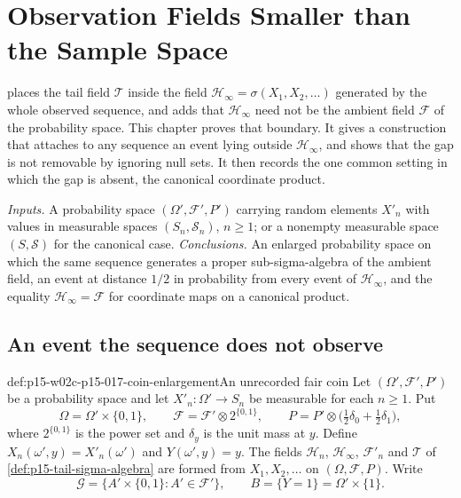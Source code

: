 \chapter{Observation Fields Smaller than the Sample Space}
\label{sec:p15-w02c-p15-017-observation-fields}

 places the tail field \(\mathcal T\)
inside the field \(\mathcal H_\infty=\sigma(X_1,X_2,\ldots)\) generated by
the whole observed sequence, and adds that \(\mathcal H_\infty\) need not
be the ambient field \(\mathcal F\) of the probability space. This chapter
proves that boundary. It gives a construction that attaches to any
sequence an event lying outside \(\mathcal H_\infty\), and shows that the
gap is not removable by ignoring null sets. It then records the one
common setting in which the gap is absent, the canonical coordinate
product.

\emph{Inputs.} A probability space \((\Omega',\mathcal F',P')\) carrying
random elements \(X'_n\) with values in measurable spaces
\((S_n,\mathcal S_n)\), \(n\geq1\); or a nonempty measurable space
\((S,\mathcal S)\) for the canonical case.
\emph{Conclusions.} An enlarged probability space on which the same
sequence generates a proper sub-sigma-algebra of the ambient field, an
event at distance \(1/2\) in probability from every event of
\(\mathcal H_\infty\), and the equality \(\mathcal H_\infty=\mathcal F\)
for coordinate maps on a canonical product.

\section{An event the sequence does not observe}
\label{sec:p15-w02c-p15-017-unobserved-event}

\begin{hbdefinition}{def:p15-w02c-p15-017-coin-enlargement}{An unrecorded fair coin}
Let \((\Omega',\mathcal F',P')\) be a probability space and let
\(X'_n:\Omega'\to S_n\) be measurable for each \(n\geq1\). Put
\[
 \Omega=\Omega'\times\{0,1\},\qquad
 \mathcal F=\mathcal F'\otimes2^{\{0,1\}},\qquad
 P=P'\otimes\bigl(\tfrac12\delta_0+\tfrac12\delta_1\bigr),
\]
where \(2^{\{0,1\}}\) is the power set and \(\delta_y\) is the unit mass
at \(y\). Define \(X_n(\omega',y)=X'_n(\omega')\) and
\(Y(\omega',y)=y\). The fields \(\mathcal H_n\), \(\mathcal H_\infty\),
\(\mathcal F'_n\) and \(\mathcal T\) of
\cref{def:p15-tail-sigma-algebra} are formed from \(X_1,X_2,\ldots\) on
\((\Omega,\mathcal F,P)\). Write
\[
 \mathcal G=\{A'\times\{0,1\}:A'\in\mathcal F'\},\qquad
 B=\{Y=1\}=\Omega'\times\{1\}.
\]
\end{hbdefinition}


